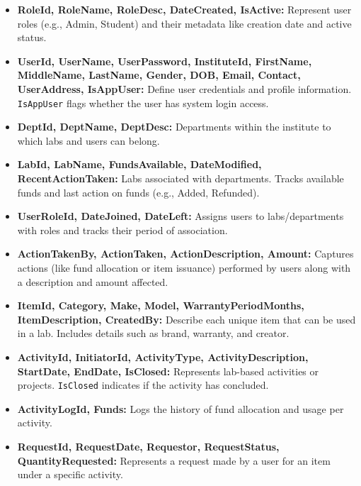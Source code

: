 \documentclass[11pt]{article}
\begin{document}
\begin{itemize}
  \item \textbf{RoleId, RoleName, RoleDesc, DateCreated, IsActive:} Represent user roles (e.g., Admin, Student) and their metadata like creation date and active status.
  
  \item \textbf{UserId, UserName, UserPassword, InstituteId, FirstName, MiddleName, LastName, Gender, DOB, Email, Contact, UserAddress, IsAppUser:} Define user credentials and profile information. \texttt{IsAppUser} flags whether the user has system login access.
  
  \item \textbf{DeptId, DeptName, DeptDesc:} Departments within the institute to which labs and users can belong.
  
  \item \textbf{LabId, LabName, FundsAvailable, DateModified, RecentActionTaken:} Labs associated with departments. Tracks available funds and last action on funds (e.g., Added, Refunded).
  
  \item \textbf{UserRoleId, DateJoined, DateLeft:} Assigns users to labs/departments with roles and tracks their period of association.
  
  \item \textbf{ActionTakenBy, ActionTaken, ActionDescription, Amount:} Captures actions (like fund allocation or item issuance) performed by users along with a description and amount affected.
  
  \item \textbf{ItemId, Category, Make, Model, WarrantyPeriodMonths, ItemDescription, CreatedBy:} Describe each unique item that can be used in a lab. Includes details such as brand, warranty, and creator.
  
  \item \textbf{ActivityId, InitiatorId, ActivityType, ActivityDescription, StartDate, EndDate, IsClosed:} Represents lab-based activities or projects. \texttt{IsClosed} indicates if the activity has concluded.
  
  \item \textbf{ActivityLogId, Funds:} Logs the history of fund allocation and usage per activity.
  
  \item \textbf{RequestId, RequestDate, Requestor, RequestStatus, QuantityRequested:} Represents a request made by a user for an item under a specific activity.
  

\end{itemize}
\end{document}
